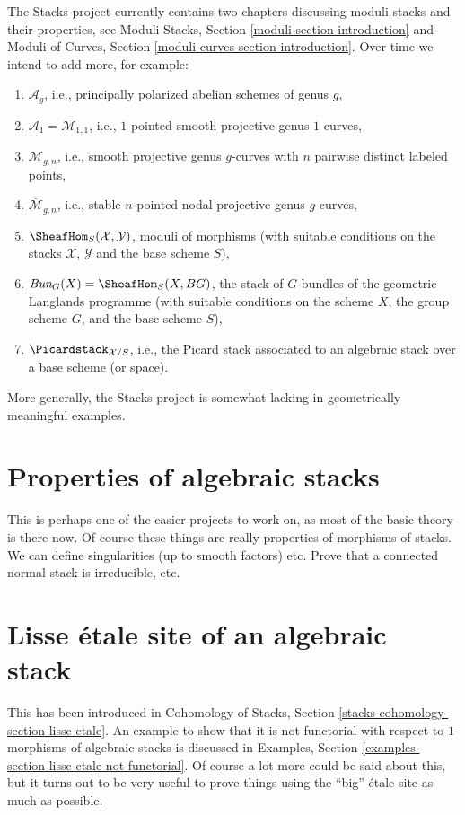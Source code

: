 \noindent
The Stacks project currently contains two chapters discussing
moduli stacks and their properties, see
Moduli Stacks, Section \ref{moduli-section-introduction} and
Moduli of Curves, Section \ref{moduli-curves-section-introduction}.
Over time we intend to add more, for example:
\begin{enumerate}
\item $\mathcal{A}_g$,
i.e., principally polarized abelian schemes of genus $g$,
\item $\mathcal{A}_1 = \mathcal{M}_{1, 1}$, i.e.,
$1$-pointed smooth projective genus $1$ curves,
\item $\mathcal{M}_{g, n}$, i.e., smooth projective genus $g$-curves
with $n$ pairwise distinct labeled points,
\item $\overline{\mathcal{M}}_{g, n}$, i.e.,
stable $n$-pointed nodal projective genus $g$-curves,
\item $\SheafHom_S(\mathcal{X}, \mathcal{Y})$, moduli of morphisms
(with suitable conditions on the stacks $\mathcal{X}$, $\mathcal{Y}$
and the base scheme $S$),
\item $\textit{Bun}_G(X) = \SheafHom_S(X, BG)$, the stack of $G$-bundles
of the geometric Langlands programme (with suitable conditions on the scheme
$X$, the group scheme $G$, and the base scheme $S$),
\item $\Picardstack_{\mathcal{X}/S}$, i.e., the Picard stack associated
to an algebraic stack over a base scheme (or space).
\end{enumerate}
More generally, the Stacks project is somewhat
lacking in geometrically meaningful examples.


\section{Properties of algebraic stacks}
\label{section-stacks-properties}

\noindent
This is perhaps one of the easier projects to work on, as most of the
basic theory is there now. Of course these things are really properties
of morphisms of stacks. We can define singularities (up to smooth factors)
etc. Prove that a connected normal stack is irreducible, etc.


\section{Lisse \'etale site of an algebraic stack}
\label{section-lisse-etale}

\noindent
This has been introduced in
Cohomology of Stacks, Section \ref{stacks-cohomology-section-lisse-etale}.
An example to show that it is not functorial with respect to $1$-morphisms
of algebraic stacks is discussed in
Examples, Section \ref{examples-section-lisse-etale-not-functorial}.
Of course a lot more could be said about this, but it turns out
to be very useful to prove things using the ``big'' \'etale site
as much as possible.



